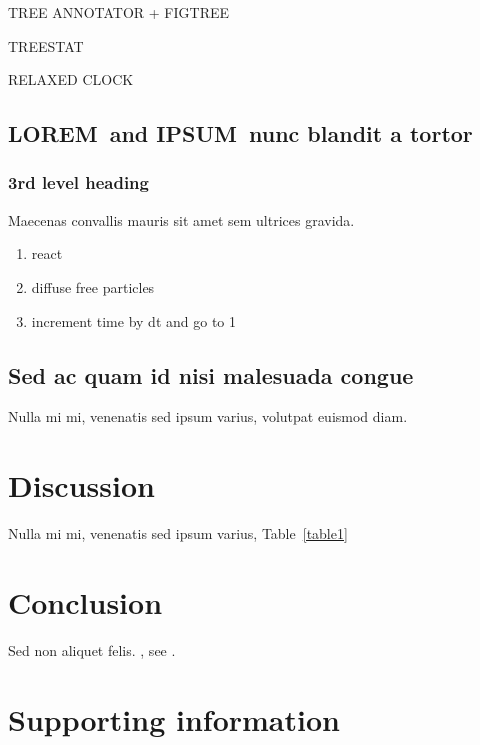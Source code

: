\documentclass[10pt,letterpaper]{article}
\newcommand{\lorem}{{\bf LOREM}}
\newcommand{\ipsum}{{\bf IPSUM}}
\begin{document}

TREE ANNOTATOR + FIGTREE

TREESTAT

RELAXED CLOCK

\subsection*{\lorem\ and \ipsum\ nunc blandit a tortor}
\subsubsection*{3rd level heading} 
Maecenas convallis mauris sit amet sem ultrices gravida.

\begin{enumerate}
	\item{react}
	\item{diffuse free particles}
	\item{increment time by dt and go to 1}
\end{enumerate}


\subsection*{Sed ac quam id nisi malesuada congue}

Nulla mi mi, venenatis sed ipsum varius, volutpat euismod diam. 



\section*{Discussion}
Nulla mi mi, venenatis sed ipsum varius, Table~\ref{table1} 

\section*{Conclusion}


Sed non aliquet felis. , see .

\section*{Supporting information}
\end{document}
